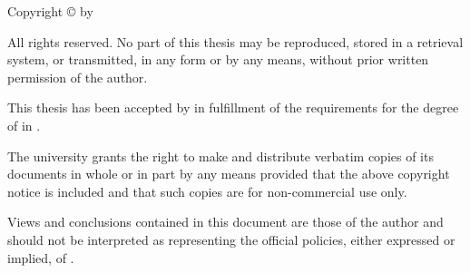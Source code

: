
\vspace*{\fill}

\begin{center}
  \large
  Copyright \copyright{} \thesisyear{} by \thesisauthor

  \vspace{1cm}

  All rights reserved. No part of this thesis may be reproduced, stored
  in a retrieval system, or transmitted, in any form or by any means,
  without prior written permission of the author.

  \vspace{1cm}

  This thesis has been accepted by \thesisuniversity{} in fulfillment of
  the requirements for the degree of \thesisdegree{} in \thesisprogram.

  \vspace{1cm}

  The university grants the right to make and distribute verbatim copies
  of its documents in whole or in part by any means provided that the
  above copyright notice is included and that such copies are for
  non-commercial use only.

  \vspace{1cm}

  Views and conclusions contained in this document are those of the
  author and should not be interpreted as representing the official
  policies, either expressed or implied, of \thesisuniversity.

  \vspace{1cm}

  \thesisdate
\end{center}

\vspace*{\fill}
